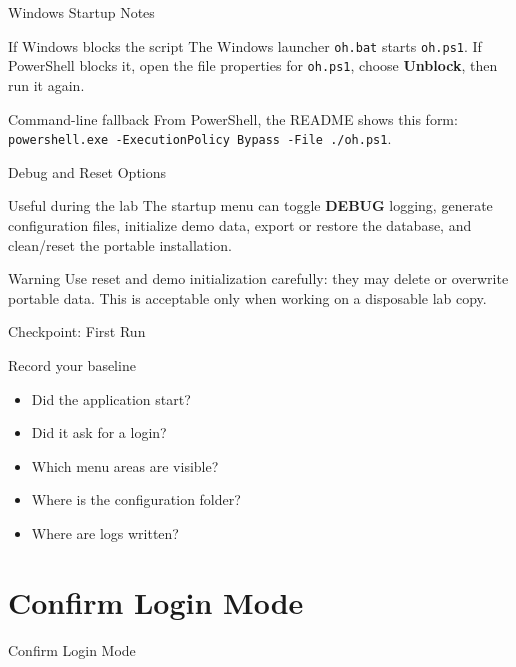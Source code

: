 \documentclass[presentation]{beamer}
\newcommand{\sectiontitleframe}[1]{
\begin{frame}[plain,c]
\begin{center}
{\usebeamerfont{title}\usebeamercolor[fg]{title}#1}
\end{center}
\end{frame}
}
\begin{document}
\begin{frame}[c]{Windows Startup Notes}
\begin{block}{If Windows blocks the script}
The Windows launcher \texttt{oh.bat} starts \texttt{oh.ps1}. If PowerShell blocks it, open the file
properties for \texttt{oh.ps1}, choose \textbf{Unblock}, then run it again.
\end{block}

\begin{exampleblock}{Command-line fallback}
From PowerShell, the README shows this form:
\texttt{powershell.exe -ExecutionPolicy Bypass -File ./oh.ps1}.
\end{exampleblock}
\end{frame}

\begin{frame}[c]{Debug and Reset Options}
\begin{block}{Useful during the lab}
The startup menu can toggle \textbf{DEBUG} logging, generate configuration files, initialize demo
data, export or restore the database, and clean/reset the portable installation.
\end{block}

\begin{exampleblock}{Warning}
Use reset and demo initialization carefully: they may delete or overwrite portable data. This is
acceptable only when working on a disposable lab copy.
\end{exampleblock}
\end{frame}

\begin{frame}[c]{Checkpoint: First Run}
\begin{block}{Record your baseline}
\begin{itemize}
    \item Did the application start?
    \item Did it ask for a login?
    \item Which menu areas are visible?
    \item Where is the configuration folder?
    \item Where are logs written?
\end{itemize}
\end{block}
\end{frame}

\section{Confirm Login Mode}
\sectiontitleframe{Confirm Login Mode}
\end{document}
